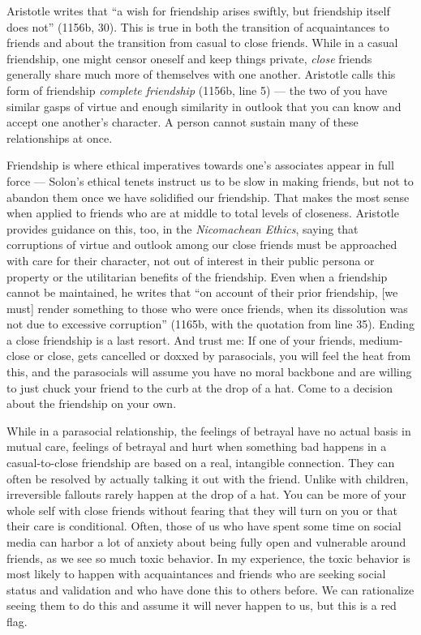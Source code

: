 \documentclass[
]{book}
\begin{document}
Aristotle writes that ``a wish for friendship arises swiftly, but friendship itself does not'' (1156b, 30). This is true in both the transition of acquaintances to friends and about the transition from casual to close friends. While in a casual friendship, one might censor oneself and keep things private, \emph{close} friends generally share much more of themselves with one another. Aristotle calls this form of friendship \emph{complete friendship} (1156b, line 5) --- the two of you have similar gasps of virtue and enough similarity in outlook that you can know and accept one another's character. A person cannot sustain many of these relationships at once.

Friendship is where ethical imperatives towards one's associates appear in full force --- Solon's ethical tenets instruct us to be slow in making friends, but not to abandon them once we have solidified our friendship. That makes the most sense when applied to friends who are at middle to total levels of closeness. Aristotle provides guidance on this, too, in the \emph{Nicomachean Ethics}, saying that corruptions of virtue and outlook among our close friends must be approached with care for their character, not out of interest in their public persona or property or the utilitarian benefits of the friendship. Even when a friendship cannot be maintained, he writes that ``on account of their prior friendship, {[}we must{]} render something to those who were once friends, when its dissolution was not due to excessive corruption'' (1165b, with the quotation from line 35). Ending a close friendship is a last resort. And trust me: If one of your friends, medium-close or close, gets cancelled or doxxed by parasocials, you will feel the heat from this, and the parasocials will assume you have no moral backbone and are willing to just chuck your friend to the curb at the drop of a hat. Come to a decision about the friendship on your own.

While in a parasocial relationship, the feelings of betrayal have no actual basis in mutual care, feelings of betrayal and hurt when something bad happens in a casual-to-close friendship are based on a real, intangible connection. They can often be resolved by actually talking it out with the friend. Unlike with children, irreversible fallouts rarely happen at the drop of a hat. You can be more of your whole self with close friends without fearing that they will turn on you or that their care is conditional. Often, those of us who have spent some time on social media can harbor a lot of anxiety about being fully open and vulnerable around friends, as we see so much toxic behavior. In my experience, the toxic behavior is most likely to happen with acquaintances and friends who are seeking social status and validation and who have done this to others before. We can rationalize seeing them to do this and assume it will never happen to us, but this is a red flag.
\end{document}
